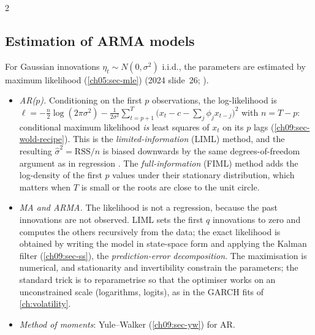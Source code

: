 \begin{paracol}{2}
\subsection{Estimation of ARMA models}\label{ch09:sec-est}
For Gaussian innovations $\eta_t\sim N(0,\sigma^2)$ i.i.d., the parameters are estimated by maximum likelihood
(\cref{ch05:sec-mle}) (2024 slide~26; ).
\begin{itemize}
  \item \emph{AR($p$).} Conditioning on the first $p$ observations, the log-likelihood is
        $\ell=-\frac n2\log(2\pi\sigma^2)-\frac1{2\sigma^2}\sum_{t=p+1}^{T}\bigl(x_t-c-\sum_j\phi_jx_{t-j}\bigr)^2$ with $n=T-p$:
        conditional maximum likelihood \emph{is} least squares of $x_t$ on its $p$ lags (\cref{ch09:sec-wold-recipe}). This is
        the \emph{limited-information} (LIML) method, and the resulting $\hat\sigma^2=\mathrm{RSS}/n$ is
        biased downwards by the same degrees-of-freedom argument as in regression . The
        \emph{full-information} (FIML) method adds the log-density of the first $p$ values under their stationary distribution,
        which matters when $T$ is small or the roots are close to the unit circle.
  \item \emph{MA and ARMA.} The likelihood is not a regression, because the past innovations are not observed. LIML sets the
        first $q$ innovations to zero and computes the others recursively from the data; the exact likelihood is obtained by
        writing the model in state-space form and applying the Kalman filter (\cref{ch09:sec-ss}), the
        \emph{prediction-error decomposition}. The maximisation is numerical, and stationarity and invertibility constrain the
        parameters; the standard trick is to reparametrise so that the optimiser works on an unconstrained
        scale (logarithms, logits), as in the GARCH fits of \cref{ch:volatility}.
  \item \emph{Method of moments}: Yule--Walker (\cref{ch09:sec-yw}) for AR.
\end{itemize}


\end{paracol}
